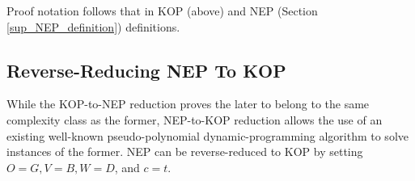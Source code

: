 						\vspace{4pt}\noindent Proof notation follows that in KOP (above) and NEP (Section \ref{sup_NEP_definition}) definitions.

\subsection{Reverse-Reducing NEP To KOP}\label{reverse_reduction}
			While the KOP-to-NEP reduction proves the later to belong to the same complexity class as
			the former, NEP-to-KOP reduction allows the use of an existing well-known pseudo-polynomial dynamic-programming algorithm  \cite{pisinger_where_2005}
			to solve instances of the former. NEP can be reverse-reduced to KOP by setting $O=G, V=B, W=D$, and \textbf{$c=t$}.

\printbibliography

